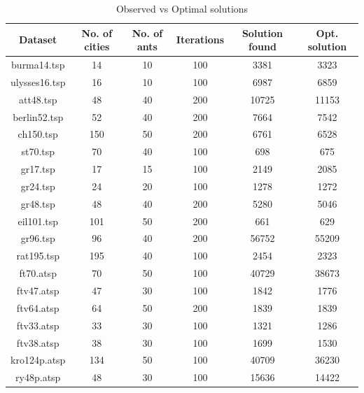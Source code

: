 \documentclass[14pt, english]{article}
\begin{document}
\begin{table}[h!]
  \begin{center}
    \caption{Observed vs Optimal solutions}
    \label{tab:table1}
    \begin{tabular}{c|c|c|c|c|c}
      \textbf{Dataset} & \textbf{No. of cities} & \textbf{No. of ants} & \textbf{Iterations} & \textbf{Solution found}  &\textbf{Opt. solution}\\ %
      \hline
      {burma14.tsp} & 14 & 10 & 100 & 3381 & 3323 \\ %
      {ulysses16.tsp} & 16 & 10 & 100 & 6987 & 6859 \\ 
	 {att48.tsp} & 48 & 40 & 200 & 10725 & 11153 \\ %
	 {berlin52.tsp} & 52 & 40 & 200 & 7664 & 7542 \\ %
	 {ch150.tsp} & 150 & 50 & 200 & 6761 & 6528 \\ %
	 {st70.tsp} & 70 & 40 & 100 & 698 & 675 \\ %
	 {gr17.tsp} & 17 & 15 & 100 & 2149 & 2085 \\ %
	 {gr24.tsp} & 24 & 20 & 100 & 1278 & 1272 \\ %
	 {gr48.tsp} & 48 & 40 & 200 & 5280 & 5046 \\ %
	 {eil101.tsp} & 101 & 50 & 200 & 661 & 629 \\ %
	 {gr96.tsp} & 96 & 40 & 200 & 56752 & 55209 \\ %
	 {rat195.tsp} & 195 & 40 & 100 & 2454 & 2323 \\ %
	 {ft70.atsp} & 70 & 50 & 100 & 40729 & 38673 \\ %
	 {ftv47.atsp} & 47 & 30 & 100 & 1842 & 1776 \\ %
	 {ftv64.atsp} & 64 & 50 & 200 & 1839 & 1839 \\ %
	 {ftv33.atsp} & 33 & 30 & 100 & 1321 & 1286 \\ %
	 {ftv38.atsp} & 38 & 30 & 100 & 1699 & 1530 \\ %
	 {kro124p.atsp} & 134 & 50 & 100 & 40709 &  36230 \\ %
	 {ry48p.atsp} & 48 & 30 & 100 & 15636 & 14422 \\ %
	 
    \end{tabular}
  \end{center}
\end{table}
\newpage
\end{document}

